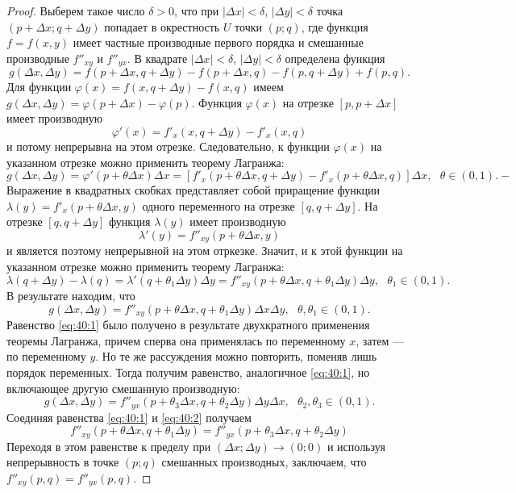 \documentclass[12pt]{report}
\numberwithin{equation}{section}
\begin{document}
\begin{proof}
Выберем такое число $\delta > 0$, что при $|\Delta x| < \delta$, $|\Delta y| < \delta$ точка $(p + \Delta x; q + \Delta y)$ попадает в окрестность $U$ точки $(p;q)$, где функция $f = f(x,y)$ имеет частные производные первого порядка и смешанные производные $f''_{xy}$ и $f''_{yx}$. В квадрате $|\Delta x| < \delta$, $|\Delta y| < \delta$ определена функция
\[ g(\Delta x, \Delta y) = f(p + \Delta x, q + \Delta y) - f(p + \Delta x, q) - f(p, q + \Delta y) + f(p,q).\]
Для функции $\varphi(x) = f(x, q + \Delta y) - f (x,q)$ имеем $g(\Delta x, \Delta y) = \varphi(p + \Delta x) - \varphi(p)$. Функция $\varphi(x)$ на отрезке $[p, p + \Delta x]$ имеет производную
\[ \varphi'(x) = f'_x (x, q + \Delta y) - f'_x (x,q)\]
и потому непрерывна на этом отрезке. Следовательно, к функции $\varphi(x)$ на указанном отрезке можно применить теорему Лагранжа:
\[ g(\Delta x, \Delta y) = \varphi'(p + \theta \Delta x) \Delta x = [f'_x ( p + \theta \Delta x, q + \Delta y) - f'_x (p + \theta \Delta x, q)]\Delta x,~~~\theta \in (0,1).-\]
Выражение в квадратных скобках представляет собой приращение функции $\lambda (y) = f'_x(p + \theta \Delta x, y)$ одного переменного на отрезке $[q, q + \Delta y]$. На отрезке $[q, q + \Delta y]$ функция $\lambda(y)$ имеет производную
\[ \lambda'(y) = f''_{xy}(p + \theta \Delta x, y)\]
и является поэтому непрерывной на этом отркезке. Значит, и к этой функции на указанном отрезке можно применить теорему Лагранжа:
\[ \lambda(q + \Delta y) - \lambda(q) = \lambda'(q + \theta_1 \Delta y)\Delta y = f''_{xy} (p + \theta \Delta x, q + \theta_1 \Delta y) \Delta y,~~~\theta_1 \in (0,1).\]
В результате находим, что
\begin{equation} \label{eq:40:1}
g(\Delta x, \Delta y) = f''_{xy} (p + \theta \Delta x, q  +\theta_1 \Delta y) \Delta x \Delta y,~~~ \theta, \theta_1 \in (0,1).
\end{equation}
Равенство \eqref{eq:40:1} было получено в результате двухкратного применения теоремы Лагранжа, причем сперва она применялась по переменному $x$, затем --- по переменному $y$. Но те же рассуждения можно повторить, поменяв лишь порядок переменных. Тогда получим равенство, аналогичное \eqref{eq:40:1}, но включающее другую смешанную производную:
\begin{equation} \label{eq:40:2}
g(\Delta x, \Delta y) = f''_{yx} (p + \theta_3 \Delta x, q  +\theta_2 \Delta y) \Delta y \Delta x,~~~ \theta_2, \theta_3 \in (0,1).
\end{equation}
Соединяя равенства \eqref{eq:40:1} и \eqref{eq:40:2} получаем
\[  f''_{xy} (p + \theta \Delta x, q  +\theta_1 \Delta y) = f''_{yx} (p + \theta_3 \Delta x, q  +\theta_2 \Delta y)\]
Переходя в этом равенстве к пределу при $(\Delta x; \Delta y) \to (0; 0)$ и используя непрерывность в точке $(p;q)$ смешанных производных, заключаем, что $f''_{xy}(p,q) = f''_{yx}(p,q)$.
\end{proof}
\end{document}
